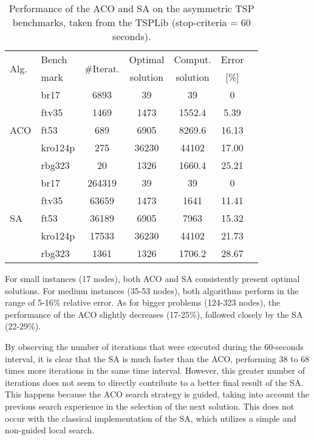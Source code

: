 \begin{table}[b]
\centering
\caption{Performance of the ACO and SA on the asymmetric TSP benchmarks, taken from the TSPLib (stop-criteria = 60 seconds). }
\label{tab:tsp_results}
\begin{tabular}{@{}l l c c c c c@{}}
\hline
\multirow{2}{*}{Alg.}& Bench   & \multirow{2}{*}{\#Iterat.}  & Optimal  & Comput.  & Error  \\ 
                     & mark    &                             & solution & solution &  [\%]  \\ \hline
\multirow{5}{*}{ACO} & br17    & 6893    & 39        & 39       & 0              \\  
                     & ftv35   & 1469    & 1473      & 1552.4   & 5.39         \\  
                     & ft53    & 689     & 6905      & 8269.6   & 16.13        \\ 
                     & kro124p  & 275     & 36230     & 44102    & 17.00         \\   
                     & rbg323  & 20      & 1326      & 1660.4   & 25.21      \\ \hline
\multirow{5}{*}{SA}  & br17    & 264319  & 39        & 39       & 0               \\  
                     & ftv35   & 63659   & 1473      & 1641		& 11.41       \\  
                     & ft53    & 36189   & 6905      & 7963     & 15.32        \\  
                     & kro124p  & 17533    & 36230     & 44102   & 21.73      \\  
                     & rbg323  & 1361    & 1326      & 1706.2   & 28.67        \\ \hline
\end{tabular}
\end{table}

For small instances (17 nodes), both ACO and SA consistently present optimal solutions. For medium instances (35-53 nodes), both algorithms perform in the range of 5-16$\%$ relative error. As for bigger problems (124-323 nodes), the performance of the ACO slightly decreases (17-25\%), followed closely by the SA (22-29\%). 

By observing the number of iterations that were executed during the 60-seconds interval, it is clear that the SA is much faster than the ACO, performing 38 to 68 times more iterations in the same time interval. However, this greater number of iterations does not seem to directly contribute to a better final result of the SA. This happens because the ACO search strategy is guided, taking into account the previous search experience in the selection of the next solution. This does not occur with the classical implementation of the SA, which utilizes a simple and non-guided local search.

